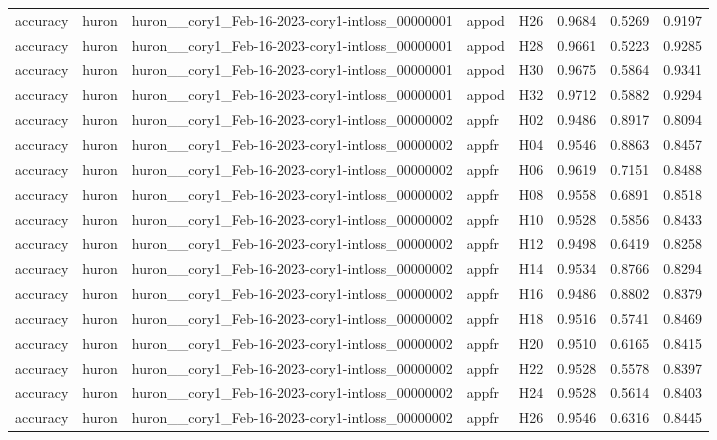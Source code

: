 \begin{table}[tbp]
\begin{tabular}{lllllrrr}
accuracy & huron & huron\_\_cory1\_Feb-16-2023-cory1-intloss\_00000001 & appod & H26 & 0.9684 & 0.5269 & 0.9197 \\
accuracy & huron & huron\_\_cory1\_Feb-16-2023-cory1-intloss\_00000001 & appod & H28 & 0.9661 & 0.5223 & 0.9285 \\
accuracy & huron & huron\_\_cory1\_Feb-16-2023-cory1-intloss\_00000001 & appod & H30 & 0.9675 & 0.5864 & 0.9341 \\
accuracy & huron & huron\_\_cory1\_Feb-16-2023-cory1-intloss\_00000001 & appod & H32 & 0.9712 & 0.5882 & 0.9294 \\
accuracy & huron & huron\_\_cory1\_Feb-16-2023-cory1-intloss\_00000002 & appfr & H02 & 0.9486 & 0.8917 & 0.8094 \\
accuracy & huron & huron\_\_cory1\_Feb-16-2023-cory1-intloss\_00000002 & appfr & H04 & 0.9546 & 0.8863 & 0.8457 \\
accuracy & huron & huron\_\_cory1\_Feb-16-2023-cory1-intloss\_00000002 & appfr & H06 & 0.9619 & 0.7151 & 0.8488 \\
accuracy & huron & huron\_\_cory1\_Feb-16-2023-cory1-intloss\_00000002 & appfr & H08 & 0.9558 & 0.6891 & 0.8518 \\
accuracy & huron & huron\_\_cory1\_Feb-16-2023-cory1-intloss\_00000002 & appfr & H10 & 0.9528 & 0.5856 & 0.8433 \\
accuracy & huron & huron\_\_cory1\_Feb-16-2023-cory1-intloss\_00000002 & appfr & H12 & 0.9498 & 0.6419 & 0.8258 \\
accuracy & huron & huron\_\_cory1\_Feb-16-2023-cory1-intloss\_00000002 & appfr & H14 & 0.9534 & 0.8766 & 0.8294 \\
accuracy & huron & huron\_\_cory1\_Feb-16-2023-cory1-intloss\_00000002 & appfr & H16 & 0.9486 & 0.8802 & 0.8379 \\
accuracy & huron & huron\_\_cory1\_Feb-16-2023-cory1-intloss\_00000002 & appfr & H18 & 0.9516 & 0.5741 & 0.8469 \\
accuracy & huron & huron\_\_cory1\_Feb-16-2023-cory1-intloss\_00000002 & appfr & H20 & 0.9510 & 0.6165 & 0.8415 \\
accuracy & huron & huron\_\_cory1\_Feb-16-2023-cory1-intloss\_00000002 & appfr & H22 & 0.9528 & 0.5578 & 0.8397 \\
accuracy & huron & huron\_\_cory1\_Feb-16-2023-cory1-intloss\_00000002 & appfr & H24 & 0.9528 & 0.5614 & 0.8403 \\
accuracy & huron & huron\_\_cory1\_Feb-16-2023-cory1-intloss\_00000002 & appfr & H26 & 0.9546 & 0.6316 & 0.8445 \\

\end{tabular}
\end{table}
